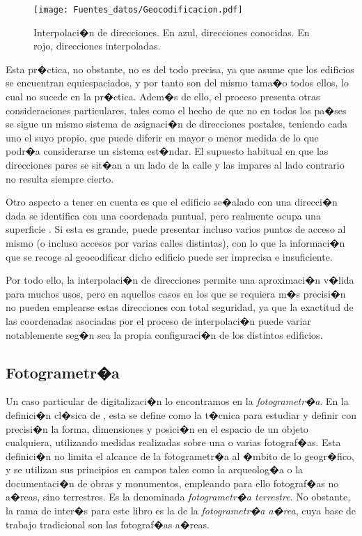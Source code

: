 \begin{figure}
\centering
\texttt{[image: Fuentes\_datos/Geocodificacion.pdf]}
\caption{\small Interpolaci�n de direcciones. En azul, direcciones conocidas. En rojo, direcciones interpoladas.}
\label{Fig:Geocodificacion} 
\end{figure}

Esta pr�ctica, no obstante, no es del todo precisa, ya que asume que los edificios se encuentran equiespaciados, y por tanto son del mismo tama�o todos ellos, lo cual no sucede en la pr�ctica.  Adem�s de ello, el proceso presenta otras consideraciones particulares, tales como el hecho de que no en todos los pa�ses se sigue un mismo sistema de asignaci�n de direcciones postales, teniendo cada uno el suyo propio, que puede diferir en mayor o menor medida de lo que podr�a considerarse un sistema est�ndar. El supuesto habitual en que las direcciones pares se sit�an a un lado de la calle y las impares al lado contrario no resulta siempre cierto.

Otro aspecto a tener en cuenta es que el edificio se�alado con una direcci�n dada se identifica con una coordenada puntual, pero realmente ocupa una superficie \cite{WikipediaGeocoding}. Si esta es grande, puede presentar incluso varios puntos de acceso al mismo (o incluso accesos por varias calles distintas), con lo que la informaci�n que se recoge al geocodificar dicho edificio puede ser imprecisa e insuficiente.

Por todo ello, la interpolaci�n de direcciones permite una aproximaci�n v�lida para muchos usos, pero en aquellos casos en los que se requiera m�s precisi�n no pueden emplearse estas direcciones con total seguridad, ya que la exactitud de las coordenadas asociadas por el proceso de interpolaci�n puede variar notablemente seg�n sea la propia configuraci�n de los distintos edificios.

\subsection{Fotogrametr�a}
\label{Fotogrametria}


Un caso particular de digitalizaci�n lo encontramos en la \emph{fotogrametr�a}. En la definici�n cl�sica de \cite{Bonneval1972Eyrolles}, esta se define como la t�cnica para estudiar y definir con precisi�n la forma, dimensiones y posici�n en el espacio de un objeto cualquiera, utilizando medidas realizadas sobre una o varias fotograf�as. Esta definici�n no limita el alcance de la fotogrametr�a al �mbito de lo geogr�fico, y se utilizan sus principios en campos tales como la arqueolog�a o la documentaci�n de obras y monumentos, empleando para ello fotograf�as no a�reas, sino terrestres. Es la denominada \emph{fotogrametr�a terrestre}. No obstante, la rama de inter�s para este libro es la de la \emph{fotogrametr�a a�rea}, cuya base de trabajo tradicional son las fotograf�as a�reas.

